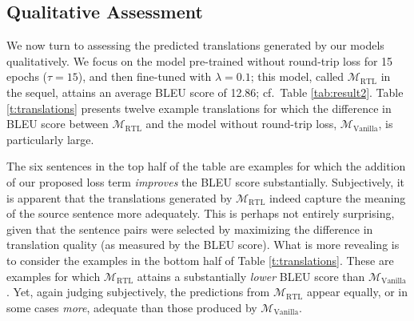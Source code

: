 \documentclass[10pt,a4paper]{article}
\begin{document}
\subsection{Qualitative Assessment}
We now turn to assessing the predicted translations generated by our models qualitatively. We focus on the model pre-trained without round-trip loss for 15 epochs ($\tau=15$), and then fine-tuned with $\lambda=0.1$; this model, called $\mathcal{M}_\mathrm{RTL}$ in the sequel, attains an average BLEU score of 12.86; cf.\ Table \ref{tab:result2}. Table \ref{t:translations} presents twelve example translations for which the difference in BLEU score between $\mathcal{M}_\mathrm{RTL}$ and the model without round-trip loss, $\mathcal{M}_\mathrm{Vanilla}$, is particularly large.

The six sentences in the top half of the table are examples for which the addition of our proposed loss term \emph{improves} the BLEU score substantially. Subjectively, it is apparent that the translations generated by $\mathcal{M}_\mathrm{RTL}$ indeed capture the meaning of the source sentence more adequately. This is perhaps not entirely surprising, given that the sentence pairs were selected by maximizing the difference in translation quality (as measured by the BLEU score). What is more revealing is to consider the examples in the bottom half of Table \ref{t:translations}. These are examples for which $\mathcal{M}_\mathrm{RTL}$ attains a substantially \emph{lower} BLEU score than $\mathcal{M}_\mathrm{Vanilla}$. Yet, again judging subjectively, the predictions from $\mathcal{M}_\mathrm{RTL}$ appear equally, or in some cases \emph{more}, adequate than those produced by $\mathcal{M}_\mathrm{Vanilla}$.
\end{document}
